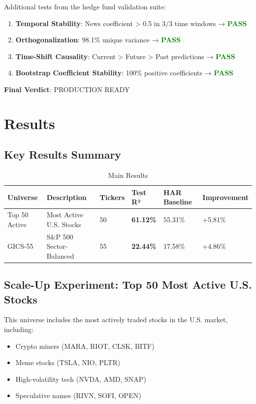 \documentclass[12pt,a4paper]{article}
\begin{document}
Additional tests from the hedge fund validation suite:

\begin{enumerate}
    \item \textbf{Temporal Stability}: News coefficient > 0.5 in 3/3 time windows → \textcolor{green}{\textbf{PASS}}
    \item \textbf{Orthogonalization}: 98.1\% unique variance → \textcolor{green}{\textbf{PASS}}
    \item \textbf{Time-Shift Causality}: Current > Future > Past predictions → \textcolor{green}{\textbf{PASS}}
    \item \textbf{Bootstrap Coefficient Stability}: 100\% positive coefficients → \textcolor{green}{\textbf{PASS}}
\end{enumerate}

\textbf{Final Verdict}: PRODUCTION READY

\section{Results}

\subsection{Key Results Summary}

\begin{table}[H]
\centering
\begin{tabular}{llllll}
\toprule
\textbf{Universe} & \textbf{Description} & \textbf{Tickers} & \textbf{Test R²} & \textbf{HAR Baseline} & \textbf{Improvement} \\
\midrule
Top 50 Active & Most Active U.S. Stocks & 50 & \textbf{61.12\%} & 55.31\% & +5.81\% \\
GICS-55 & S\&P 500 Sector-Balanced & 55 & \textbf{22.44\%} & 17.58\% & +4.86\% \\
\bottomrule
\end{tabular}
\caption{Main Results}
\label{tab:main_results}
\end{table}

\subsection{Scale-Up Experiment: Top 50 Most Active U.S. Stocks}

This universe includes the most actively traded stocks in the U.S. market, including:
\begin{itemize}
    \item Crypto miners (MARA, RIOT, CLSK, BITF)
    \item Meme stocks (TSLA, NIO, PLTR)
    \item High-volatility tech (NVDA, AMD, SNAP)
    \item Speculative names (RIVN, SOFI, OPEN)
\end{itemize}
\end{document}
